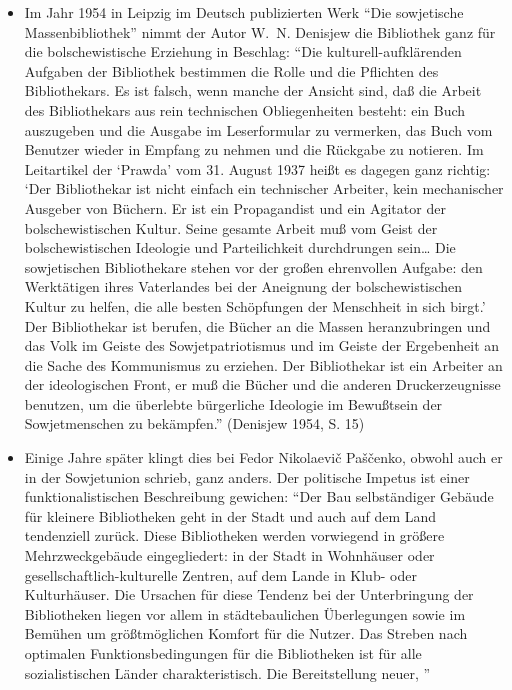 \documentclass[a4paper,
fontsize=11pt,
oneside,
numbers=noperiodatend,
parskip=half-,
bibliography=totoc,
final
]{scrartcl}
\begin{document}
\begin{itemize}
\item
  Im Jahr 1954 in Leipzig im Deutsch publizierten Werk \enquote{Die
  sowjetische Massenbibliothek} nimmt der Autor W.~N. Denisjew die
  Bibliothek ganz für die bolschewistische Erziehung in Beschlag:
  \enquote{Die kulturell-aufklärenden Aufgaben der Bibliothek bestimmen
  die Rolle und die Pflichten des Bibliothekars. Es ist falsch, wenn
  manche der Ansicht sind, daß die Arbeit des Bibliothekars aus rein
  technischen Obliegenheiten besteht: ein Buch auszugeben und die
  Ausgabe im Leserformular zu vermerken, das Buch vom Benutzer wieder in
  Empfang zu nehmen und die Rückgabe zu notieren. Im Leitartikel der
  \enquote{Prawda} vom 31. August 1937 heißt es dagegen ganz richtig:
  \enquote{Der Bibliothekar ist nicht einfach ein technischer Arbeiter,
  kein mechanischer Ausgeber von Büchern. Er ist ein Propagandist und
  ein Agitator der bolschewistischen Kultur. Seine gesamte Arbeit muß
  vom Geist der bolschewistischen Ideologie und Parteilichkeit
  durchdrungen sein\ldots{} Die sowjetischen Bibliothekare stehen vor
  der großen ehrenvollen Aufgabe: den Werktätigen ihres Vaterlandes bei
  der Aneignung der bolschewistischen Kultur zu helfen, die alle besten
  Schöpfungen der Menschheit in sich birgt.} Der Bibliothekar ist
  berufen, die Bücher an die Massen heranzubringen und das Volk im
  Geiste des Sowjetpatriotismus und im Geiste der Ergebenheit an die
  Sache des Kommunismus zu erziehen. Der Bibliothekar ist ein Arbeiter
  an der ideologischen Front, er muß die Bücher und die anderen
  Druckerzeugnisse benutzen, um die überlebte bürgerliche Ideologie im
  Bewußtsein der Sowjetmenschen zu bekämpfen.} (Denisjew 1954, S. 15)
\item
  Einige Jahre später klingt dies bei Fedor Nikolaevič Paščenko, obwohl
  auch er in der Sowjetunion schrieb, ganz anders. Der politische
  Impetus ist einer funktionalistischen Beschreibung gewichen:
  \enquote{Der Bau selbständiger Gebäude für kleinere Bibliotheken geht
  in der Stadt und auch auf dem Land tendenziell zurück. Diese
  Bibliotheken werden vorwiegend in größere Mehrzweckgebäude
  eingegliedert: in der Stadt in Wohnhäuser oder
  gesellschaftlich-kulturelle Zentren, auf dem Lande in Klub- oder
  Kulturhäuser. Die Ursachen für diese Tendenz bei der Unterbringung der
  Bibliotheken liegen vor allem in städtebaulichen Überlegungen sowie im
  Bemühen um größtmöglichen Komfort für die Nutzer. Das Streben nach
  optimalen Funktionsbedingungen für die Bibliotheken ist für alle
  sozialistischen Länder charakteristisch. Die Bereitstellung neuer,
}
\end{itemize}
\end{document}
